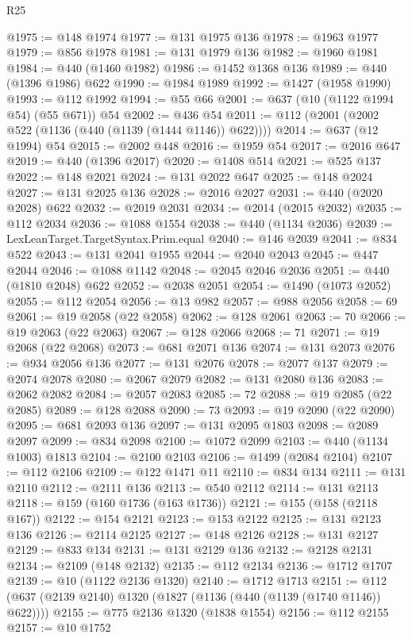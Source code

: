 \begin{lexlean}{R25}
\begin{coremodule}
@1975 := @148 @1974
@1977 := @131 @1975 @136
@1978 := @1963 @1977
@1979 := @856 @1978
@1981 := @131 @1979 @136
@1982 := @1960 @1981
@1984 := @440 (@1460 @1982)
@1986 := @1452 @1368 @136
@1989 := @440 (@1396 @1986) @622
@1990 := @1984 @1989
@1992 := @1427 (@1958 @1990)
@1993 := @112 @1992
@1994 := @55 @66
@2001 := @637 (@10 (@1122 @1994 @54) (@55 @671)) @54
@2002 := @436 @54
@2011 := @112 (@2001 (@2002 @522 (@1136 (@440 (@1139 (@1444 @1146)) @622))))
@2014 := @637 (@12 @1994) @54
@2015 := @2002 @448
@2016 := @1959 @54
@2017 := @2016 @647
@2019 := @440 (@1396 @2017)
@2020 := @1408 @514
@2021 := @525 @137
@2022 := @148 @2021
@2024 := @131 @2022 @647
@2025 := @148 @2024
@2027 := @131 @2025 @136
@2028 := @2016 @2027
@2031 := @440 (@2020 @2028) @622
@2032 := @2019 @2031
@2034 := @2014 (@2015 @2032)
@2035 := @112 @2034
@2036 := @1088 @1554
@2038 := @440 (@1134 @2036)
@2039 := LexLeanTarget.TargetSyntax.Prim.equal
@2040 := @146 @2039
@2041 := @834 @522
@2043 := @131 @2041 @1955
@2044 := @2040 @2043
@2045 := @447 @2044
@2046 := @1088 @1142
@2048 := @2045 @2046 @2036
@2051 := @440 (@1810 @2048) @622
@2052 := @2038 @2051
@2054 := @1490 (@1073 @2052)
@2055 := @112 @2054
@2056 := @13 @982
@2057 := @988 @2056
@2058 := 69
@2061 := @19 @2058 (@22 @2058)
@2062 := @128 @2061
@2063 := 70
@2066 := @19 @2063 (@22 @2063)
@2067 := @128 @2066
@2068 := 71
@2071 := @19 @2068 (@22 @2068)
@2073 := @681 @2071 @136
@2074 := @131 @2073
@2076 := @934 @2056 @136
@2077 := @131 @2076
@2078 := @2077 @137
@2079 := @2074 @2078
@2080 := @2067 @2079
@2082 := @131 @2080 @136
@2083 := @2062 @2082
@2084 := @2057 @2083
@2085 := 72
@2088 := @19 @2085 (@22 @2085)
@2089 := @128 @2088
@2090 := 73
@2093 := @19 @2090 (@22 @2090)
@2095 := @681 @2093 @136
@2097 := @131 @2095 @1803
@2098 := @2089 @2097
@2099 := @834 @2098
@2100 := @1072 @2099
@2103 := @440 (@1134 @1003) @1813
@2104 := @2100 @2103
@2106 := @1499 (@2084 @2104)
@2107 := @112 @2106
@2109 := @122 @1471 @11
@2110 := @834 @134
@2111 := @131 @2110
@2112 := @2111 @136
@2113 := @540 @2112
@2114 := @131 @2113
@2118 := @159 (@160 @1736 (@163 @1736))
@2121 := @155 (@158 (@2118 @167))
@2122 := @154 @2121
@2123 := @153 @2122
@2125 := @131 @2123 @136
@2126 := @2114 @2125
@2127 := @148 @2126
@2128 := @131 @2127
@2129 := @833 @134
@2131 := @131 @2129 @136
@2132 := @2128 @2131
@2134 := @2109 (@148 @2132)
@2135 := @112 @2134
@2136 := @1712 @1707
@2139 := @10 (@1122 @2136 @1320)
@2140 := @1712 @1713
@2151 := @112 (@637 (@2139 @2140) @1320 (@1827 (@1136 (@440 (@1139 (@1740 @1146)) @622))))
@2155 := @775 @2136 @1320 (@1838 @1554)
@2156 := @112 @2155
@2157 := @10 @1752

\end{coremodule}
\end{lexlean}

